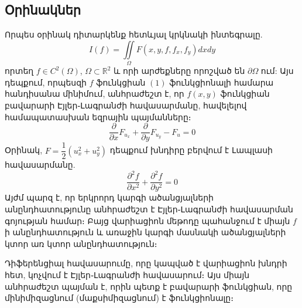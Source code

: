\documentclass[fleqn, bachelor,subf,12pt,notitlepage]{article}
\begin{document}
\subsection*{Օրինակներ}
\hspace{\parindent}Որպես օրինակ դիտարկենք հետևյալ կրկնակի ինտեգրալը.
\begin{equation}
I\left(f\right)=\iint \limits_{\Omega} F\left(x, y, f, f_{x}, f_{y}\right)dxdy
\end{equation}
որտեղ $f \in C^{2}(\Omega)$,  $\Omega\subset \mathbb{R}^{2}$ և որի արժեքները որոշված են $\partial \Omega$ ում:
Այս դեպքում, որպեսզի $f$ ֆունկցիան $\left(1\right)$ ֆունկցիոնալի համարա հանդիսանա մինիմում, անհրաժեշտ է, որ $f(x,y)$ ֆունկցիան բավարարի Էյլեր֊Լագրանժի հավասարմանը, հավելելով համապատասխան եզրային պայմանները։
\begin{equation}
\dfrac{\partial}{\partial x}F_{u_{x}} + \dfrac{\partial}{\partial y}F_{u_{y}} - F_{u} = 0
\end{equation}
Օրինակ, $F = \dfrac{1}{2}\left(u_{x}^2+u_{y}^2\right)$ դեպքում խնդիրը բերվում է Լապլասի հավասարմանը.
\begin{equation}
\dfrac{\partial^{2}f}{\partial x^{2}} + \dfrac{\partial^{2}f}{\partial y^{2}} = 0
\end{equation}
Այժմ պարզ է, որ երկրորդ կարգի ածանցյալների անընդհատությունը անհրաժեշտ է Էյլեր֊Լագրանժի հավասարման գոյության համար։ Բայց վարիացիոն մեթոդը պահանջում է միայն $f$ ի անընդհատություն և առաջին կարգի մասնակի ածանցյալների կտոր առ կտոր անընդհատություն։

Դիֆերենցիալ հավասարումը, որը կապված է վարիացիոն խնդրի հետ, կոչվում է Էյլեր֊Լագրանժի հավասարում։ Այս միայն անհրաժեշտ պայման է, որին պետք է բավարարի ֆունկցիան, որը մինիմիզացնում (մաքսիմիզացնում) է ֆունկցիոնալը։
\end{document}
